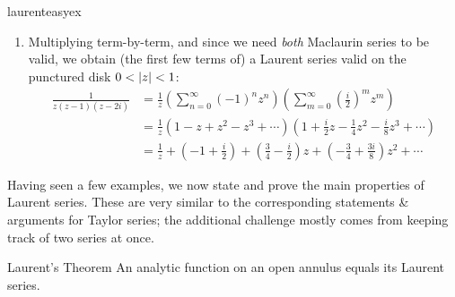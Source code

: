 \begin{examples}{}{laurenteasyex}
\begin{enumerate}
	  \item Multiplying term-by-term, and since we need \emph{both} Maclaurin series to be valid, we obtain (the first few terms of) a Laurent series valid on the punctured disk $0<\left| z\right|<1$:
	  \begin{align*}
		  \frac 1{z(z-1)(z-2i)}&=\frac 1z\left(\sum_{n=0}^\infty (-1)^nz^n\right)\left(\sum_{m=0}^\infty\left(\frac i2\right)^mz^m\right)\\
		  &=\frac 1z\left(1-z+z^2-z^3+\cdots\right)\left(1+\frac i2z-\frac 14z^2-\frac i8z^3+\cdots\right)\\
		  &=\frac 1z+\left(-1+\frac i2\right)+\left(\frac 34-\frac i2\right)z+\left(-\frac 34+\frac{3i}8\right)z^2+\cdots
	  \end{align*}
	\end{enumerate}
\end{examples}

\goodbreak



Having seen a few examples, we now state and prove the main properties of Laurent series. These are very similar to the corresponding statements \& arguments for Taylor series; the additional challenge mostly comes from keeping track of two series at once.

\begin{thm}{Laurent's Theorem}{}
	An analytic function on an open annulus equals its Laurent series.
\end{thm}

